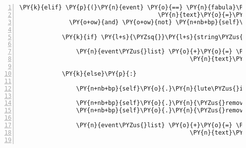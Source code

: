 \begin{Verbatim}[commandchars=\\\{\},numbers=left,firstnumber=1,stepnumber=1]
        \PY{k}{elif} \PY{p}{(}\PY{n}{event} \PY{o}{==} \PY{n}{fabula}\PY{o}{.}\PY{n}{SaysEvent}\PY{p}{(}\PY{n}{identifier}\PY{o}{=}\PY{n}{ID\PYZus{}CASSANDRA}\PY{p}{,}
                                       \PY{n}{text}\PY{o}{=}\PY{l+s}{\PYZsq{}}\PY{l+s}{Ich habe eine Laute. Leider ist sie kaputt.}\PY{l+s}{\PYZsq{}}\PY{p}{)}
              \PY{o+ow}{and} \PY{o+ow}{not} \PY{n+nb+bp}{self}\PY{o}{.}\PY{n}{lute\PYZus{}is\PYZus{}repaired}\PY{p}{)}\PY{p}{:}

            \PY{k}{if} \PY{l+s}{\PYZsq{}}\PY{l+s}{string\PYZus{}harp}\PY{l+s}{\PYZsq{}} \PY{o+ow}{not} \PY{o+ow}{in} \PY{n+nb+bp}{self}\PY{o}{.}\PY{n}{host}\PY{o}{.}\PY{n}{rack}\PY{o}{.}\PY{n}{entity\PYZus{}dict}\PY{o}{.}\PY{n}{keys}\PY{p}{(}\PY{p}{)}\PY{p}{:}

                \PY{n}{event\PYZus{}list} \PY{o}{+}\PY{o}{=} \PY{p}{[}\PY{n}{fabula}\PY{o}{.}\PY{n}{SaysEvent}\PY{p}{(}\PY{n}{identifier}\PY{o}{=}\PY{n}{ID\PYZus{}KUNI}\PY{p}{,}
                                                \PY{n}{text}\PY{o}{=}\PY{l+s}{\PYZsq{}}\PY{l+s}{Vielleicht kann man die noch reparieren.}\PY{l+s}{\PYZsq{}}\PY{p}{)}\PY{p}{]}

            \PY{k}{else}\PY{p}{:}

                \PY{n+nb+bp}{self}\PY{o}{.}\PY{n}{lute\PYZus{}is\PYZus{}repaired} \PY{o}{=} \PY{n+nb+bp}{True}

                \PY{n+nb+bp}{self}\PY{o}{.}\PY{n}{\PYZus{}remove\PYZus{}sentence}\PY{p}{(}\PY{n}{ID\PYZus{}CASSANDRA}\PY{p}{,} \PY{n}{event}\PY{o}{.}\PY{n}{text}\PY{p}{)}
                \PY{n+nb+bp}{self}\PY{o}{.}\PY{n}{\PYZus{}remove\PYZus{}sentence}\PY{p}{(}\PY{n}{ID\PYZus{}KUNI}\PY{p}{,} \PY{l+s}{\PYZsq{}}\PY{l+s}{Ich habe eine Saite von einer Harfe.}\PY{l+s}{\PYZsq{}}\PY{p}{)}

                \PY{n}{event\PYZus{}list} \PY{o}{+}\PY{o}{=} \PY{p}{[}\PY{n}{fabula}\PY{o}{.}\PY{n}{SaysEvent}\PY{p}{(}\PY{n}{identifier}\PY{o}{=}\PY{n}{ID\PYZus{}KUNI}\PY{p}{,}
                                                \PY{n}{text}\PY{o}{=}\PY{l+s}{\PYZsq{}}\PY{l+s}{Ich habe ein Harfensaite. Vielleicht können wir sie damit reparieren}\PY{l+s}{\PYZsq{}}\PY{p}{)}\PY{p}{]}


\end{Verbatim}
